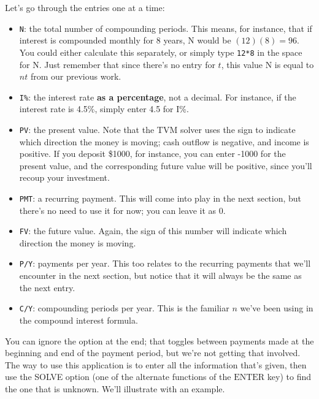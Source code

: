 Let's go through the entries one at a time:
\begin{itemize}
\item \texttt{N}: the total number of compounding periods.  This means, for instance, that if interest is compounded monthly for 8 years, N would be $(12)(8) = 96$.  You could either calculate this separately, or simply type \texttt{12*8} in the space for N.  Just remember that since there's no entry for $t$, this value N is equal to $nt$ from our previous work.
\item \texttt{I\%}: the interest rate \textbf{as a percentage}, not a decimal.  For instance, if the interest rate is 4.5\%, simply enter 4.5 for I\%.
\item \texttt{PV}: the present value.  Note that the TVM solver uses the sign to indicate which direction the money is moving; cash outflow is negative, and income is positive.  If you deposit \$1000, for instance, you can enter -1000 for the present value, and the corresponding future value will be positive, since you'll recoup your investment.
\item \texttt{PMT}: a recurring payment.  This will come into play in the next section, but there's no need to use it for now; you can leave it as 0.
\item \texttt{FV}: the future value.  Again, the sign of this number will indicate which direction the money is moving.
\item \texttt{P/Y}: payments per year.  This too relates to the recurring payments that we'll encounter in the next section, but notice that it will always be the same as the next entry.
\item \texttt{C/Y}: compounding periods per year.  This is the familiar $n$ we've been using in the compound interest formula.
\end{itemize}

You can ignore the option at the end; that toggles between payments made at the beginning and end of the payment period, but we're not getting that involved.\\

The way to use this application is to enter all the information that's given, then use the SOLVE option (one of the alternate functions of the $\boxed{\textrm{ENTER}}$ key) to find the one that is unknown.  We'll illustrate with an example.
\pagebreak

